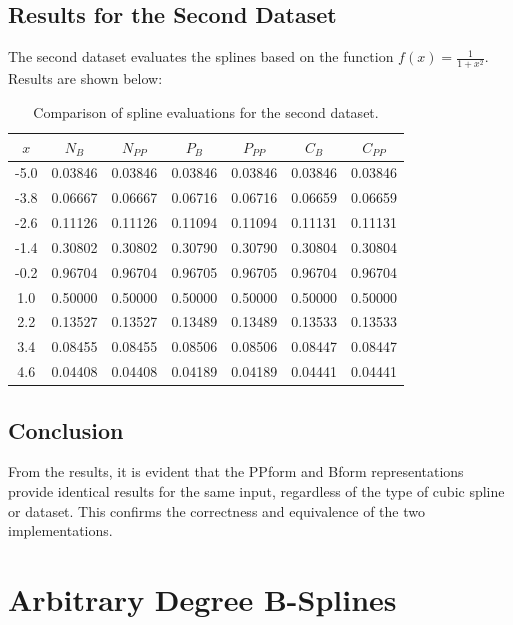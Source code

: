 \documentclass[a4paper]{article}
\begin{document}
\subsection*{Results for the Second Dataset}

The second dataset evaluates the splines based on the function $f(x) = \frac{1}{1 + x^2}$. Results are shown below:

\begin{table}[ht]
\centering
\begin{tabular}{|c|c|c|c|c|c|c|}
\hline
$x$ & $N_B$ & $N_{PP}$ & $P_B$ & $P_{PP}$ & $C_B$ & $C_{PP}$ \\
\hline
-5.0 & 0.03846 & 0.03846 & 0.03846 & 0.03846 & 0.03846 & 0.03846 \\
-3.8 & 0.06667 & 0.06667 & 0.06716 & 0.06716 & 0.06659 & 0.06659 \\
-2.6 & 0.11126 & 0.11126 & 0.11094 & 0.11094 & 0.11131 & 0.11131 \\
-1.4 & 0.30802 & 0.30802 & 0.30790 & 0.30790 & 0.30804 & 0.30804 \\
-0.2 & 0.96704 & 0.96704 & 0.96705 & 0.96705 & 0.96704 & 0.96704 \\
1.0  & 0.50000 & 0.50000 & 0.50000 & 0.50000 & 0.50000 & 0.50000 \\
2.2  & 0.13527 & 0.13527 & 0.13489 & 0.13489 & 0.13533 & 0.13533 \\
3.4  & 0.08455 & 0.08455 & 0.08506 & 0.08506 & 0.08447 & 0.08447 \\
4.6  & 0.04408 & 0.04408 & 0.04189 & 0.04189 & 0.04441 & 0.04441 \\
\hline
\end{tabular}
\caption*{Comparison of spline evaluations for the second dataset.}
\end{table}

\subsection*{Conclusion}

From the results, it is evident that the PPform and Bform representations provide identical results for the same input, regardless of the type of cubic spline or dataset. This confirms the correctness and equivalence of the two implementations.

\newpage

\section*{Arbitrary Degree B-Splines}
\end{document}

